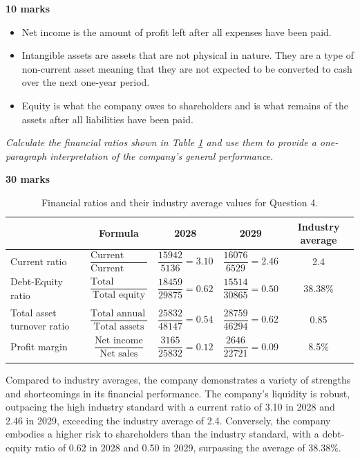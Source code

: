 \textbf{10 marks}
\begin{itemize}
    \item Net income is the amount of profit left after all expenses have been paid.
    \item Intangible assets are assets that are not physical in nature. They are a type of non-current asset meaning that they are not expected to be converted to cash over the next one-year period.
    \item Equity is what the company owes to shareholders and is what remains of the assets after all liabilities have been paid.
\end{itemize}
\textit{Calculate the financial ratios shown in Table \ref{tab:finRatio2} and use them to provide a one-paragraph interpretation of the company's general performance.}

\textbf{30 marks}
\begin{table}[H]
    \centering
    \begin{tabular}{@{}lcccc@{}}
        \toprule
                                   & \textbf{Formula}                                                & \textbf{2028}                 & \textbf{2029}                 & \textbf{Industry average} \\
        \midrule
        \addlinespace[0.5em]
        Current ratio              & $\dfrac{\textrm{Current assets}}{\textrm{Current liabilities}}$ & $\dfrac{15942}{5136} = 3.10$  & $\dfrac{16076}{6529} = 2.46$  & 2.4                       \\
        \addlinespace[1em]
        Debt-Equity ratio          & $\dfrac{\textrm{Total liabilities}}{\textrm{Total equity}}$     & $\dfrac{18459}{29875} = 0.62$ & $\dfrac{15514}{30865} = 0.50$ & 38.38\%                   \\
        \addlinespace[1em]
        Total asset turnover ratio & $\dfrac{\textrm{Total annual sales}}{\textrm{Total assets}}$    & $\dfrac{25832}{48147} = 0.54$ & $\dfrac{28759}{46294} = 0.62$ & 0.85                      \\
        \addlinespace[1em]
        Profit margin              & $\dfrac{\textrm{Net income}}{\textrm{Net sales}}$               & $\dfrac{3165}{25832} = 0.12$  & $\dfrac{2646}{22721} = 0.09$  & 8.5\%                     \\
        \addlinespace[0.5em]
        \bottomrule
    \end{tabular}
    \caption{Financial ratios and their industry average values for Question 4.}
    \label{tab:finRatio2}
\end{table}
Compared to industry averages, the company demonstrates a variety of strengths and shortcomings in its financial performance. The company's liquidity is robust, outpacing the high industry standard with a current ratio of 3.10 in 2028 and 2.46 in 2029, exceeding the industry average of 2.4. Conversely, the company embodies a higher risk to shareholders than the industry standard, with a debt-equity ratio of 0.62 in 2028 and 0.50 in 2029, surpassing the average of 38.38\%.

